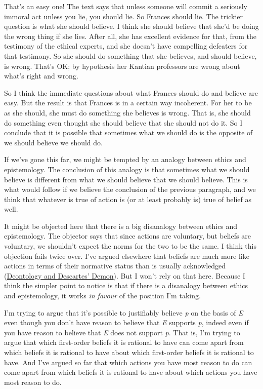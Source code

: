 \documentclass[
  10pt,
  letterpaper,
  DIV=11,
  numbers=noendperiod,
  twoside]{scrartcl}
\begin{document}
That's an easy one! The text says that unless someone will commit a
seriously immoral act unless you lie, you should lie. So Frances should
lie. The trickier question is what she should believe. I think she
should believe that she'd be doing the wrong thing if she lies. After
all, she has excellent evidence for that, from the testimony of the
ethical experts, and she doesn't have compelling defeaters for that
testimony. So she should do something that she believes, and should
believe, is wrong. That's OK; by hypothesis her Kantian professors are
wrong about what's right and wrong.

So I think the immediate questions about what Frances should do and
believe are easy. But the result is that Frances is in a certain way
incoherent. For her to be as she should, she must do something she
believes is wrong. That is, she should do something even thought she
should believe that she should not do it. So I conclude that it is
possible that sometimes what we should do is the opposite of we should
believe we should do.

If we've gone this far, we might be tempted by an analogy between ethics
and epistemology. The conclusion of this analogy is that sometimes what
we should believe is different from what we should believe that we
should believe. This is what would follow if we believe the conclusion
of the previous paragraph, and we think that whatever is true of action
is (or at least probably is) true of belief as well.

It might be objected here that there is a big disanalogy between ethics
and epistemology. The objector says that since actions are voluntary,
but beliefs are voluntary, we shouldn't expect the norms for the two to
be the same. I think this objection fails twice over. I've argued
elsewhere that beliefs are much more like actions in terms of their
normative status than is usually acknowledged
(\href{http://brian.weatherson.org/DDD.pdf}{Deontology and Descartes'
Demon}). But I won't rely on that here. Because I think the simpler
point to notice is that if there is a disanalogy between ethics and
epistemology, it works \emph{in favour} of the position I'm taking.

I'm trying to argue that it's possible to justifiably believe \emph{p}
on the basis of \emph{E} even though you don't have reason to believe
that \emph{E} supports \emph{p}, indeed even if you have reason to
believe that \emph{E} does not support \emph{p}. That is, I'm trying to
argue that which first-order beliefs it is rational to have can come
apart from which beliefs it is rational to have about which first-order
beliefs it is rational to have. And I've argued so far that which
actions you have most reason to do can come apart from which beliefs it
is rational to have about which actions you have most reason to do.
\end{document}

